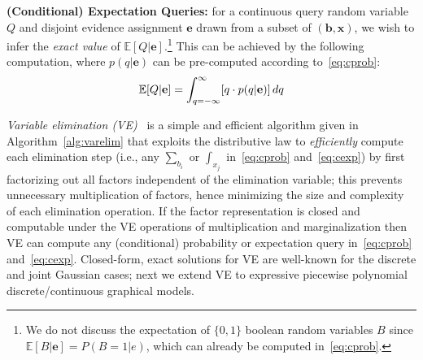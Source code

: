 \documentclass[letterpaper]{article}
\newcommand{\E}{\mathbb{E}}
\renewcommand{\vec}[1]{\mathbf{#1}}
\begin{document}
{%
{\bf (Conditional) Expectation Queries:} for a continuous
query random variable
$Q$ and disjoint evidence assignment $\vec{e}$ drawn from 
a subset of $(\vec{b},\vec{x})$, we wish to infer 
the \emph{exact value} of $\E[Q|\vec{e}]$.\footnote{We do not 
discuss the expectation of $\{0,1\}$ boolean
random variables $B$ since $\E[B|\vec{e}] = P(B=1|e)$, which can 
already be computed in~\eqref{eq:cprob}.} 
This can be achieved by the following
computation, where $p(q|\vec{e})$ can be pre-computed according to~\eqref{eq:cprob}:
\vspace{-3mm}
{\footnotesize 
\begin{equation} 
\E[Q|\vec{e}] = 
\int_{q=-\infty}^{\infty} [q \cdot p(q|\vec{e})] \, dq \label{eq:cexp}
\vspace{-2mm}
\end{equation}
}

\emph{Variable elimination (VE)}~\cite{varelim} is a simple and
efficient algorithm given in Algorithm~\ref{alg:varelim} that exploits
the distributive law to \emph{efficiently} compute each elimination
step (i.e., any $\sum_{b_{i}}$ or $\int_{x_{j}}$ in~\eqref{eq:cprob}
and~\eqref{eq:cexp}) by first factorizing out all factors independent
of the elimination variable; this prevents unnecessary multiplication
of factors, hence minimizing the size and complexity of each
elimination operation.  If the factor representation is closed and
computable under the VE operations of multiplication and
marginalization then VE can compute any (conditional) probability or
expectation query in~\eqref{eq:cprob} and~\eqref{eq:cexp}.  
Closed-form, exact solutions for VE are well-known for the discrete
and joint Gaussian cases; next we extend VE to expressive
piecewise polynomial discrete/continuous graphical models.


\incmargin{1.5em}
\linesnumbered
\begin{algorithm}[hb!]
\dontprintsemicolon


\end{algorithm}}
\end{document}
